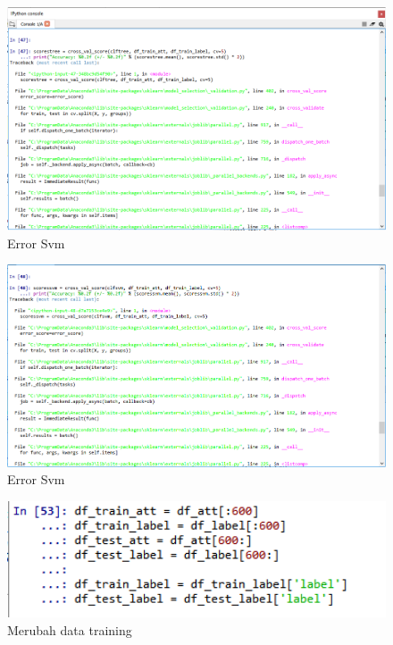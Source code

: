 \begin{figure}
      \centerline{\includegraphics[width=1\textwidth]
      {figures/cokro/c51}}
      \caption{Error Svm}
      \label{c51}
      \end{figure}

\begin{figure}
      \centerline{\includegraphics[width=1\textwidth]
      {figures/cokro/c52}}
      \caption{Error Svm}
      \label{c52}
      \end{figure}

\begin{figure}
      \centerline{\includegraphics[width=1\textwidth]
      {figures/cokro/c53}}
      \caption{Merubah data training}
      \label{c53}
      \end{figure}

